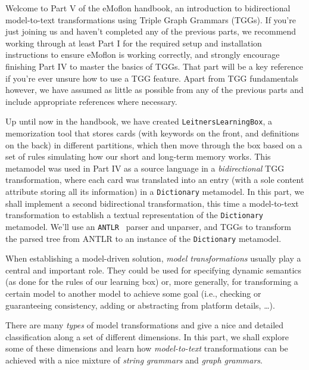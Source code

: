 \genHeader


\downloadLocation{\dlPartFive}

Welcome to Part V of the eMoflon handbook, an introduction to bidirectional model-to-text transformations using Triple Graph Grammars (TGGs). If you're just
joining us and haven't completed any of the previous parts, we recommend working through at least Part I for the required setup and installation instructions
to ensure eMoflon is working correctly, and strongly encourage finishing Part IV to master the basics of TGGs. That part will be a key reference if you're ever
unsure how to use a TGG feature. Apart from TGG fundamentals however, we have assumed as little as possible from any of the previous parts and
include appropriate references where necessary.

Up until now in the handbook, we have created \texttt{LeitnersLearningBox}, a memorization tool that stores cards (with keywords on the front, and definitions
on the back) in different partitions, which then move through the box based on a set of rules simulating how our short and long-term memory works. This
metamodel was used in Part IV as a source language in a \emph{bidirectional}  TGG transformation, where each card was
translated into an entry (with a sole content attribute storing all its information) in a \texttt{Dictionary} metamodel. In this part, we shall implement a
second bidirectional transformation, this time a model-to-text transformation to establish a textual representation of the  \texttt{Dictionary} metamodel.
We'll use an \texttt{ANTLR}~\cite{ANTLR} parser and unparser, and TGGs to transform the parsed tree from ANTLR to an instance of the \texttt{Dictionary}
metamodel.

When establishing a model-driven solution, \emph{model transformations} usually play a central and important role. They could be used for specifying dynamic
semantics (as done for the rules of our learning box) or, more generally, for transforming a certain model to another model to achieve some goal (i.e.,
checking or guaranteeing consistency, adding or abstracting from platform details, \ldots).

There are many \emph{types} of model transformations and \cite{CH03,Mens_Gorp_2006} give a nice and detailed classification along a set of different dimensions.
In this part, we shall explore some of these dimensions and learn how \emph{model-to-text} transformations can be achieved with a nice mixture of \emph{string
grammars} and \emph{graph grammars}.

